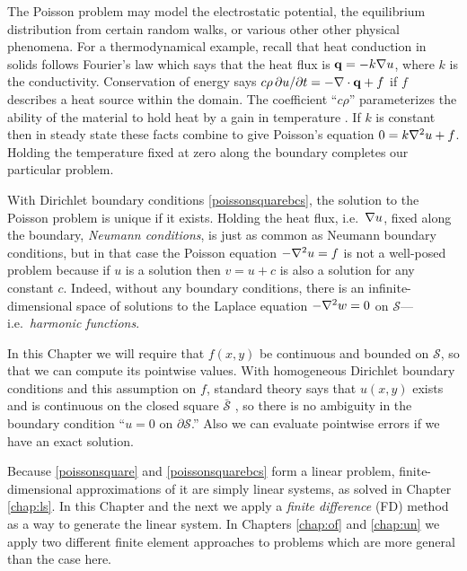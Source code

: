 The Poisson problem may model the electrostatic potential, the equilibrium distribution from certain random walks, or various other other physical phenomena.  For a thermodynamical example, recall that heat conduction in solids follows Fourier's law which says that the heat flux is $\mathbf{q} = -k \nabla u$, where $k$ is the conductivity.  Conservation of energy says $c\rho\, \partial u/\partial t = - \nabla\cdot\mathbf{q} + f$ if $f$ describes a heat source within the domain.  The coefficient ``$c\rho$'' parameterizes the ability of the material to hold heat by a gain in temperature \citep{Ockendonetal2003}.  If $k$ is constant then in steady state these facts combine to give Poisson's equation $0 = k \nabla^2 u + f$.  Holding the temperature fixed at zero along the boundary completes our particular problem.

With Dirichlet boundary conditions \eqref{poissonsquarebcs}, the solution to the Poisson problem is unique if it exists.  Holding the heat flux, i.e.~$\nabla u$, fixed along the boundary, \emph{Neumann conditions}, is just as common as Neumann boundary conditions, but in that case the Poisson equation $-\nabla^2 u = f$ is not a well-posed problem because if $u$ is a solution then $v=u+c$ is also a solution for any constant $c$.  Indeed, without any boundary conditions, there is an infinite-dimensional space of solutions to the Laplace equation $-\nabla^2 w = 0$ on $\mathcal{S}$---i.e.~\emph{harmonic functions}.

In this Chapter we will require that $f(x,y)$ be continuous and bounded on $\mathcal{S}$, so that we can compute its pointwise values.  With homogeneous Dirichlet boundary conditions and this assumption on $f$, standard theory says that $u(x,y)$ exists and is continuous on the closed square $\bar{\mathcal{S}}$ \citep[Theorem 6 in section 5.6]{Evans2010}, so there is no ambiguity in the boundary condition ``$u=0$ on $\partial \mathcal{S}$.''  Also we can evaluate pointwise errors if we have an exact solution. 

Because \eqref{poissonsquare} and \eqref{poissonsquarebcs} form a linear problem, finite-dimensional approximations of it are simply linear systems, as solved in Chapter \ref{chap:ls}. In this Chapter and the next we apply a \emph{finite difference} (FD) method as a way to generate the linear system.  In Chapters \ref{chap:of} and \ref{chap:un} we apply two different finite element approaches to problems which are more general than the case here.


